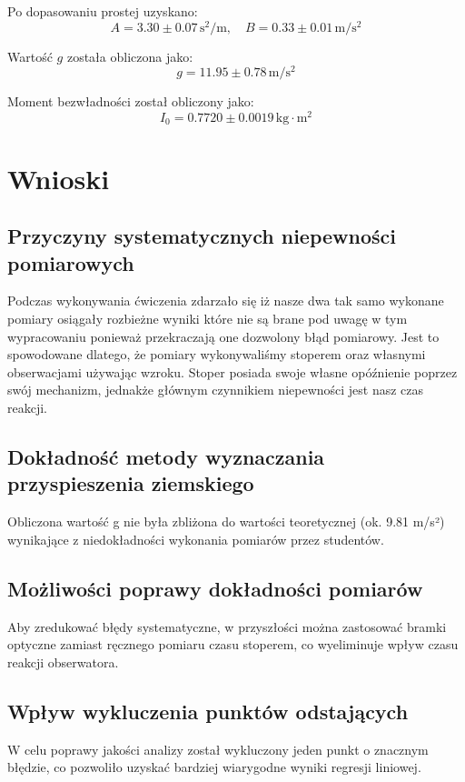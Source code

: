 \documentclass[12pt]{article}
\begin{document}
Po dopasowaniu prostej uzyskano:
\[
A = 3.30 \pm 0.07 \, \mathrm{s^2/m}, \quad B = 0.33 \pm 0.01 \, \mathrm{m/s^2}
\]

Wartość \( g \) została obliczona jako:
\[
g = 11.95 \pm 0.78 \, \mathrm{m/s^2}
\]

Moment bezwładności został obliczony jako:
\[
I_0 = 0.7720 \pm 0.0019 \, \mathrm{kg \cdot m^2}
\]


\clearpage

\section*{Wnioski}

\subsection*{Przyczyny systematycznych niepewności pomiarowych}
Podczas wykonywania ćwiczenia zdarzało się iż nasze dwa tak samo wykonane pomiary osiągały rozbieżne wyniki 
które nie są brane pod uwagę w tym wypracowaniu ponieważ przekraczają one dozwolony błąd pomiarowy. 
Jest to spowodowane dlatego, że pomiary wykonywaliśmy stoperem oraz własnymi obserwacjami używając wzroku. 
Stoper posiada swoje własne opóźnienie poprzez swój mechanizm, jednakże głównym czynnikiem niepewności jest nasz czas reakcji.



\subsection*{Dokładność metody wyznaczania przyspieszenia ziemskiego}
 Obliczona wartość g nie była zbliżona do wartości teoretycznej (ok. 9.81 m/s²) wynikające z niedokładności wykonania pomiarów przez studentów.


 \subsection*{Możliwości poprawy dokładności pomiarów}
 Aby zredukować błędy systematyczne, w przyszłości można zastosować bramki optyczne zamiast ręcznego pomiaru czasu stoperem, co wyeliminuje wpływ czasu reakcji obserwatora.


\subsection*{Wpływ wykluczenia punktów odstających}
 W celu poprawy jakości analizy został wykluczony jeden punkt o znacznym błędzie, co pozwoliło uzyskać bardziej wiarygodne wyniki regresji liniowej.
\end{document}
